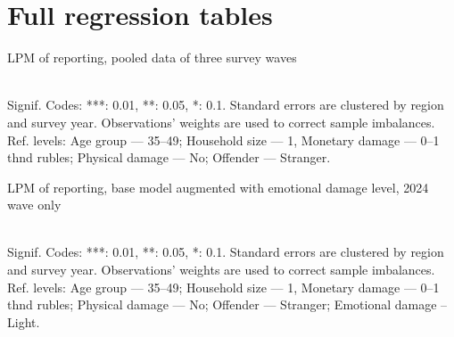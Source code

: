 \documentclass[]{interact}
\theoremstyle{plain}%
\theoremstyle{definition}
\theoremstyle{remark}
\begin{document}
%				

	\clearpage
	
	\section{Full regression tables}
	\begin{table}[h!]
		\caption{LPM of reporting, pooled data of three survey waves}
		\label{table:regr_base_full}
		\begin{adjustbox}{width=1\textwidth}
			
		\end{adjustbox}
		\\
		\footnotesize Signif. Codes: ***: 0.01, **: 0.05, *: 0.1. Standard errors are clustered by region and survey year. Observations' weights are used to correct sample imbalances. Ref. levels: Age group --- 35--49; Household size --- 1, Monetary damage --- 0--1 thnd rubles; Physical damage --- No; Offender --- Stranger. 
	\end{table}

	\clearpage
	\begin{table}[h!]
		\caption{LPM of reporting, base model augmented with emotional damage level, 2024 wave only}
		\label{table:regr_2024_full}
		\begin{adjustbox}{width=1\textwidth}
		
		\end{adjustbox}
		\\
		\footnotesize Signif. Codes: ***: 0.01, **: 0.05, *: 0.1. Standard errors are clustered by region and survey year. Observations' weights are used to correct sample imbalances. Ref. levels: Age group --- 35--49; Household size --- 1, Monetary damage --- 0--1 thnd rubles; Physical damage --- No; Offender --- Stranger; Emotional damage -- Light. 
	\end{table}
\end{document}
